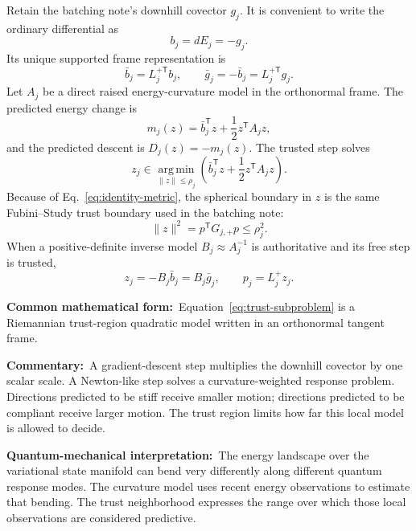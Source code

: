 \documentclass[10pt,twocolumn]{article}
\newcommand{\form}[1]{\par\noindent\textbf{Common mathematical form:}\ #1\par}
\newcommand{\commentary}[1]{\par\noindent\textbf{Commentary:}\ #1\par}
\newcommand{\phys}[1]{\par\noindent\textbf{Quantum-mechanical interpretation:}\ #1\par}
\begin{document}
Retain the batching note's downhill covector \(g_j\). It is convenient to write
the ordinary differential as
\begin{equation}
b_j=dE_j=-g_j.
\label{eq:differential-sign}
\end{equation}
Its unique supported frame representation is
\begin{equation}
\bar b_j=L_j^{+\mathsf T}b_j,
\qquad
\bar g_j=-\bar b_j=L_j^{+\mathsf T}g_j.
\label{eq:frame-gradient}
\end{equation}
Let \(A_j\) be a direct raised energy-curvature model in the orthonormal frame.
The predicted energy change is
\begin{equation}
m_j(z)
=\bar b_j^{\mathsf T}z+\frac12z^{\mathsf T}A_jz,
\label{eq:frame-quadratic-model}
\end{equation}
and the predicted descent is \(D_j(z)=-m_j(z)\). The trusted step solves
\begin{equation}
z_j\in
\operatorname*{arg\,min}_{\|z\|\leq\rho_j}
\left(
\bar b_j^{\mathsf T}z+\frac12z^{\mathsf T}A_jz
\right).
\label{eq:trust-subproblem}
\end{equation}
Because of Eq.~\eqref{eq:identity-metric}, the spherical boundary in \(z\) is
the same Fubini--Study trust boundary used in the batching note:
\begin{equation}
\|z\|^2
=p^{\mathsf T}G_{j,+}p
\leq\rho_j^2.
\label{eq:trust-equivalence}
\end{equation}
When a positive-definite inverse model \(B_j\approx A_j^{-1}\) is authoritative
and its free step is trusted,
\begin{equation}
z_j=-B_j\bar b_j=B_j\bar g_j,
\qquad
p_j=L_j^+z_j.
\label{eq:inverse-step}
\end{equation}

\form{Equation~\eqref{eq:trust-subproblem} is a Riemannian trust-region
quadratic model written in an orthonormal tangent frame.}

\commentary{A gradient-descent step multiplies the downhill covector by one
scalar scale. A Newton-like step solves a curvature-weighted response problem.
Directions predicted to be stiff receive smaller motion; directions predicted
to be compliant receive larger motion. The trust region limits how far this
local model is allowed to decide.}

\phys{The energy landscape over the variational state manifold can bend very
differently along different quantum response modes. The curvature model uses
recent energy observations to estimate that bending. The trust neighborhood
expresses the range over which those local observations are considered
predictive.}
\end{document}

